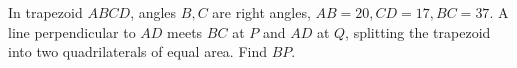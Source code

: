 In trapezoid $ABCD$, angles $B,C$ are right angles, $AB=20,CD=17,BC=37$. A line perpendicular to $AD$ meets $BC$ at $P$ and $AD$ at $Q$, splitting the trapezoid into two quadrilaterals of equal area. Find $BP$.
